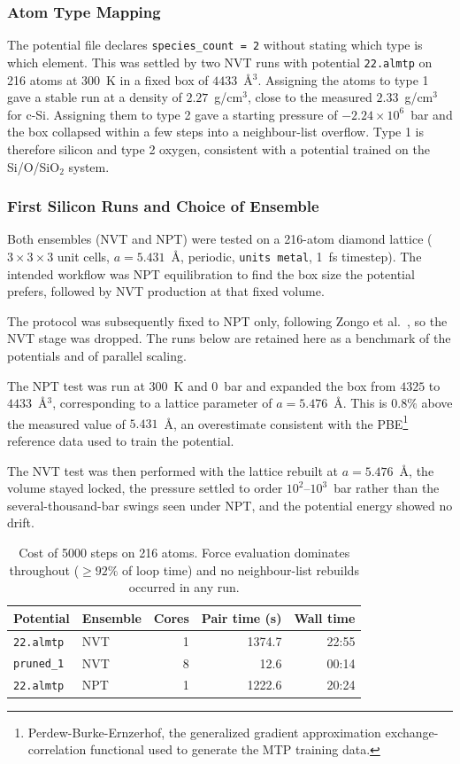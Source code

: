 \documentclass{article}
\begin{document}
\subsubsection{Atom Type Mapping}
The potential file declares \texttt{species\_count = 2} without stating which type is which element. This was settled by two NVT runs with potential \texttt{22.almtp} on 216 atoms at 300~K in a fixed box of $4433$~\AA$^3$. Assigning the atoms to type 1 gave a stable run at a density of $2.27$~g/cm$^3$, close to the measured $2.33$~g/cm$^3$ for c-Si. Assigning them to type 2 gave a starting pressure of $-2.24\times10^{6}$~bar and the box collapsed within a few steps into a neighbour-list overflow. Type 1 is therefore silicon and type 2 oxygen, consistent with a potential trained on the Si/O/SiO$_2$ system.

\subsubsection{First Silicon Runs and Choice of Ensemble}
\label{sec:firstruns}
Both ensembles (NVT and NPT) were tested on a 216-atom diamond lattice ($3\times3\times3$ unit cells, $a=5.431$~\AA, periodic, \texttt{units metal}, 1~fs timestep). The intended workflow was NPT equilibration to find the box size the potential prefers, followed by NVT production at that fixed volume.

The protocol was subsequently fixed to NPT only, following Zongo et al.~\cite{zongo2025}, so the NVT stage was dropped. The runs below are retained here as a benchmark of the potentials and of parallel scaling.

The NPT test was run at 300~K and 0~bar and expanded the box from $4325$ to $4433$~\AA$^3$, corresponding to a lattice parameter of $a=5.476$~\AA. This is $0.8\%$ above the measured value of $5.431$~\AA, an overestimate consistent with the PBE\footnote{Perdew-Burke-Ernzerhof, the generalized gradient approximation exchange-correlation functional used to generate the MTP training data.}~\cite{pbe1996} reference data used to train the potential.

The NVT test was then performed with the lattice rebuilt at $a=5.476$~\AA{}, the volume stayed locked, the pressure settled to order $10^2$--$10^3$~bar rather than the several-thousand-bar swings seen under NPT, and the potential energy showed no drift.

\begin{table}[H]
\centering
\small
\begin{tabular}{l|l|r|r|r}
\toprule
Potential & Ensemble & Cores & Pair time (s) & Wall time \\
\midrule
\texttt{22.almtp}  & NVT & 1 & 1374.7 & 22:55 \\
\texttt{pruned\_1} & NVT & 8 & 12.6   & 00:14 \\
\midrule
\texttt{22.almtp}  & NPT & 1 & 1222.6 & 20:24 \\
\bottomrule
\end{tabular}
\caption{Cost of 5000 steps on 216 atoms. Force evaluation dominates throughout ($\geq 92\%$ of loop time) and no neighbour-list rebuilds occurred in any run.}
\label{tab:firstruns}
\end{table}
\end{document}
